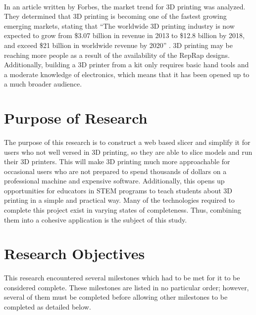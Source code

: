 \paragraph{}
In an article written by Forbes, the market trend for 3D printing was analyzed.
They determined that 3D printing is becoming one of the fastest growing emerging markets, stating that
``The worldwide 3D printing industry is now expected to grow from \$3.07 billion in revenue in 2013 to \$12.8 billion by 2018, and exceed \$21 billion in worldwide revenue by 2020'' \citep{forbes3D}.
3D printing may be reaching more people as a result of the availability of the RepRap designs.
Additionally, building a 3D printer from a kit only requires basic hand tools and a moderate knowledge of electronics, which means that it has been opened up to a much broader audience.

\section{Purpose of Research}
\paragraph{}
The purpose of this research is to construct a web based slicer and simplify it for users who not well versed in 3D printing, so they are able to slice models and run their 3D printers.
This will make 3D printing much more approachable for occasional users who are not prepared to spend thousands of dollars on a professional machine and expensive software.
Additionally, this opens up opportunities for educators in STEM programs to teach students about 3D printing in a simple and practical way.
Many of the technologies required to complete this project exist in varying states of completeness.
Thus, combining them into a cohesive application is the subject of this study.


\section{Research Objectives}
\paragraph{}
This research encountered several milestones which had to be met for it to be considered complete.
These milestones are listed in no particular order; however, several of them must be completed before allowing other milestones to be completed as detailed below.

